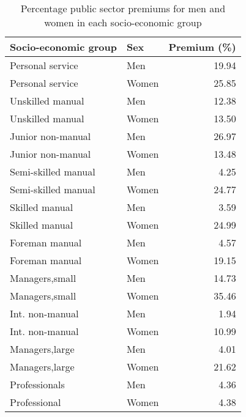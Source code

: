 \documentclass[a4paper,11pt,titlepage]{article}
\begin{document}
\begin{table}[ht]
\caption{Percentage public sector premiums for men and women in each socio-economic group \label{tab:baseprem}}
\begin{center}
\begin{tabular}{llr}
  \toprule
  Socio-economic group & Sex & Premium (\%) \\
  \midrule
	Personal service & Men & 19.94 \\
  Personal service & Women & 25.85 \\
  Unskilled manual & Men & 12.38 \\
  Unskilled manual & Women & 13.50 \\
  Junior non-manual & Men & 26.97 \\
  Junior non-manual & Women & 13.48 \\
  Semi-skilled manual & Men & 4.25 \\
  Semi-skilled manual & Women & 24.77 \\
  Skilled manual & Men & 3.59 \\
  Skilled manual & Women & 24.99 \\
  Foreman manual & Men & 4.57 \\
  Foreman manual & Women & 19.15 \\
  Managers,small & Men & 14.73 \\
  Managers,small & Women & 35.46 \\
  Int. non-manual& Men & 1.94 \\
  Int. non-manual& Women & 10.99 \\
  Managers,large & Men & 4.01 \\
  Managers,large & Women & 21.62 \\
  Professionals& Men & 4.36 \\
  Professional & Women & 4.38 \\
   \bottomrule
\end{tabular}
\end{center}
\end{table}
\end{document}
